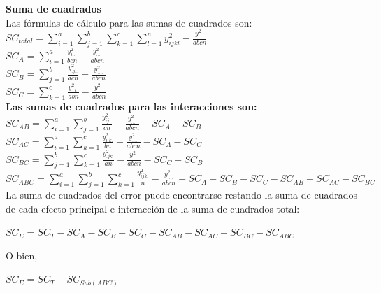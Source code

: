 \textbf{Suma de cuadrados}\\
Las fórmulas de cálculo para las sumas de cuadrados son:\\
{\large$ SC_{total} = \sum_{i=1}^{a}  \sum_{j=1}^{b}  \sum_{k=1}^{c}  \sum_{l=1}^{n} y_{ijkl}^{2} - \frac{y_{....}^{2}}{abcn} $}\\

{\large $ SC_{A} = \sum_{i=1}^{a} \frac{y_{i...}^{2}}{bcn}  - \frac{y_{....}^{2}}{abcn} $}\\

{\large$ SC_{B} = \sum_{j=1}^{b} \frac{y_{.j..}^{2}}{acn}  - \frac{y_{....}^{2}}{abcn} $} \\

{\large$ SC_{C} = \sum_{k=1}^{c} \frac{y_{..k.}^{2}}{abn} - \frac{y_{....}^{2}}{abcn} $} \\


\textbf{Las sumas de cuadrados para las interacciones son:}\\

{\large$ SC_{AB} = \sum_{i=1}^{a} \sum_{j=1}^{b}  \frac{y_{ij..}^{2}}{cn}  - \frac{y_{....}^{2}}{abcn} - SC_{A} -SC_{B} $} \\

{\large$ SC_{AC} = \sum_{i=1}^{a} \sum_{k=1}^{c}  \frac{y_{i.k.}^{2}}{bn}  - \frac{y_{....}^{2}}{abcn} - SC_{A} -SC_{C} $} \\

{\large$ SC_{BC} = \sum_{j=1}^{b} \sum_{k=1}^{c}  \frac{y_{.jk.}^{2}}{an}  - \frac{y_{....}^{2}}{abcn} - SC_{C} -SC_{B} $} \\


$ SC_{ABC} =  \sum_{i=1}^{a}  \sum_{j=1}^{b}  \sum_{k=1}^{c}  \frac{y_{ijk.}^{2}}{n}  - \frac{y_{....}^{2}}{abcn} - SC_{A} -SC_{B} - SC_{C} -SC_{AB} -SC_{AC} -SC_{BC}  $ \\


La suma de cuadrados del error puede encontrarse restando la suma de cuadrados de cada efecto principal e interacción de la suma de cuadrados total:\\

\begin{center}
	$ SC_{E} = SC_{T} -SC_{A} - SC_{B}-SC_{C} -SC_{AB} -SC_{AC} -SC_{BC} -SC_{ABC} $\\
\end{center}

O bien,
\begin{center}
	$ SC_{E} = SC_{T} - SC_{Sub(ABC)} $\\
\end{center}

